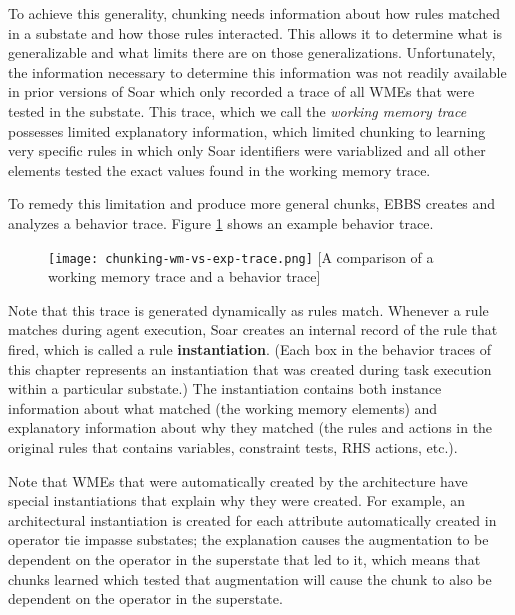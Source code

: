 To achieve this generality, chunking needs information about how rules matched in a substate and how those rules interacted. This allows it to determine what is generalizable and what limits there are on those generalizations. Unfortunately, the information necessary to determine this information was not readily available in prior versions of Soar which only recorded a trace of all WMEs that were tested in the substate.  This trace, which we call the \textit{working memory trace} possesses limited explanatory information, which limited chunking to learning very specific rules in which only Soar identifiers were variablized and all other elements tested the exact values found in the working memory trace.

To remedy this limitation and produce more general chunks, EBBS creates and analyzes a behavior trace. Figure \ref{fig:chunking-wm-vs-exp} shows an example behavior trace.



\vspace{18pt}
\begin{figure}[!h]
	\centering
	\texttt{[image: chunking-wm-vs-exp-trace.png]}
	[A comparison of a working memory trace and a behavior trace]
	\label{fig:chunking-wm-vs-exp}
\end{figure}
\vspace{6pt}

Note that this trace is generated dynamically as rules match.  Whenever a rule matches during agent execution, Soar creates an internal record of the rule that fired, which is called a rule \textbf{instantiation}.  (Each box in the behavior traces of this chapter represents an instantiation that was created during task execution within a particular substate.) The instantiation contains both instance information about what matched (the working memory elements) and explanatory information about why they matched (the rules and actions in the original rules that contains variables, constraint tests, RHS actions, etc.).

Note that WMEs that were automatically created by the architecture have special instantiations that explain why they were created.  For example, an architectural instantiation is created for each  attribute automatically created in operator tie impasse substates; the explanation causes the  augmentation to be dependent on the operator in the superstate that led to it, which means that chunks learned which tested that  augmentation will cause the chunk to also be dependent on the operator in the superstate.

